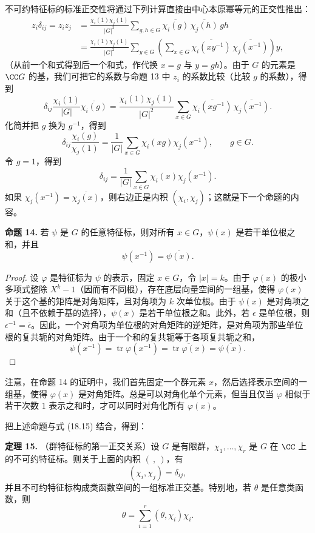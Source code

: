 不可约特征标的标准正交性将通过下列计算直接由中心本原幂等元的正交性推出：
\[
\begin{aligned}
  z_i\delta_{ij}=z_iz_j
  &=\frac{\chi_i(1)\chi_j(1)}{|G|^2}
    \sum_{g,h\in G}\overline{\chi_i(g)}\,\overline{\chi_j(h)}\,gh\\
  &=\frac{\chi_i(1)\chi_j(1)}{|G|^2}
    \sum_{y\in G}\left(\sum_{x\in G}\overline{\chi_i(xy^{-1})}\,\overline{\chi_j(x^{-1})}\right)y,
\end{aligned}
\]
（从前一个和式得到后一个和式，作代换 $x=g$ 与 $y=gh$）。由于 $G$ 的元素是 $\CC G$ 的基，我们可把它的系数与命题 13 中 $z_i$ 的系数比较（比较 $g$ 的系数），得到
\[
  \delta_{ij}\frac{\chi_i(1)}{|G|}\overline{\chi_i(g)}
  =\frac{\chi_i(1)\chi_j(1)}{|G|^2}
  \sum_{x\in G}\overline{\chi_i(xg^{-1})}\,\overline{\chi_j(x^{-1})}.
\]
化简并把 $g$ 换为 $g^{-1}$，得到
\[
  \delta_{ij}\frac{\chi_i(g)}{\chi_j(1)}
  =\frac1{|G|}\sum_{x\in G}\chi_i(xg)\chi_j(x^{-1}),
  \qquad g\in G.
  \tag{18.14}
\]
令 $g=1$，得到
\[
  \delta_{ij}=\frac1{|G|}\sum_{x\in G}\chi_i(x)\chi_j(x^{-1}).
  \tag{18.15}
\]
如果 $\chi_j(x^{-1})=\overline{\chi_j(x)}$，则右边正是内积 $(\chi_i,\chi_j)$；这就是下一个命题的内容。

\medskip
\noindent\textbf{命题 14.} 若 $\psi$ 是 $G$ 的任意特征标，则对所有 $x\in G$，$\psi(x)$ 是若干单位根之和，并且
\[
  \psi(x^{-1})=\overline{\psi(x)}.
\]

\begin{proof}
设 $\varphi$ 是特征标为 $\psi$ 的表示，固定 $x\in G$，令 $|x|=k$。由于 $\varphi(x)$ 的极小多项式整除 $X^k-1$（因而有不同根），存在底层向量空间的一组基，使得 $\varphi(x)$ 关于这个基的矩阵是对角矩阵，且对角项为 $k$ 次单位根。由于 $\psi(x)$ 是对角项之和（且不依赖于基的选择），$\psi(x)$ 是若干单位根之和。此外，若 $\epsilon$ 是单位根，则 $\epsilon^{-1}=\overline{\epsilon}$。因此，一个对角项为单位根的对角矩阵的逆矩阵，是对角项为那些单位根的复共轭的对角矩阵。由于一个和的复共轭等于各项复共轭之和，
\[
  \psi(x^{-1})=\operatorname{tr}\varphi(x^{-1})
  =\overline{\operatorname{tr}\varphi(x)}=
  \overline{\psi(x)}.
\]
\end{proof}

注意，在命题 14 的证明中，我们首先固定一个群元素 $x$，然后选择表示空间的一组基，使得 $\varphi(x)$ 是对角矩阵。总是可以对角化单个元素，但当且仅当 $\varphi$ 相似于若干次数 $1$ 表示之和时，才可以同时对角化所有 $\varphi(x)$。

把上述命题与式 (18.15) 结合，得到：

\medskip
\noindent\textbf{定理 15.} （群特征标的第一正交关系）设 $G$ 是有限群，$\chi_1,
\ldots,\chi_r$ 是 $G$ 在 $\CC$ 上的不可约特征标。则关于上面的内积 $(\ ,\ )$，有
\[
  (\chi_i,\chi_j)=\delta_{ij},
\]
并且不可约特征标构成类函数空间的一组标准正交基。特别地，若 $\theta$ 是任意类函数，则
\[
  \theta=\sum_{i=1}^r (\theta,\chi_i)\chi_i.
\]

